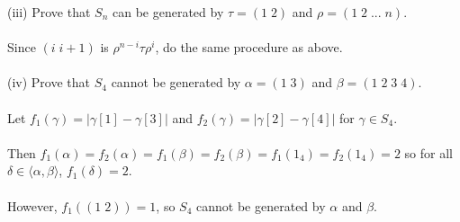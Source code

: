 \documentclass{article}
\begin{document}
\begin{siderules}
\color{blue}(iii) Prove that \(S_{n}\) can be generated by \(\tau=(1\;2)\) and \(\rho=(1\;2\;...\;n)\).\color{black}\\\\
\null\qquad Since \((i\;i+1)\) is \(\rho^{n-i}\tau\rho^{i}\), do the same procedure as above.\\\\
\color{blue}(iv) Prove that \(S_{4}\) cannot be generated by \(\alpha=(1\;3)\) and \(\beta=(1\;2\;3\;4)\).\color{black}\\\\
\null\qquad Let \(f_{1}(\gamma)=|\gamma[1]-\gamma[3]|\) and \(f_{2}(\gamma)=|\gamma[2]-\gamma[4]|\) for \(\gamma\in S_{4}\).\\\\
\null\qquad Then \(f_{1}(\alpha)=f_{2}(\alpha)=f_{1}(\beta)=f_{2}(\beta)=f_{1}(1_{4})=f_{2}(1_{4})=2\) so for all \(\delta\in\langle\alpha, \beta\rangle\), \(f_{1}(\delta)=2\).\\\\
\null\qquad However, \(f_{1}((1\;2))=1\), so \(S_{4}\) cannot be generated by \(\alpha\) and \(\beta\).
\end{siderules}
\newpage
\end{document}
